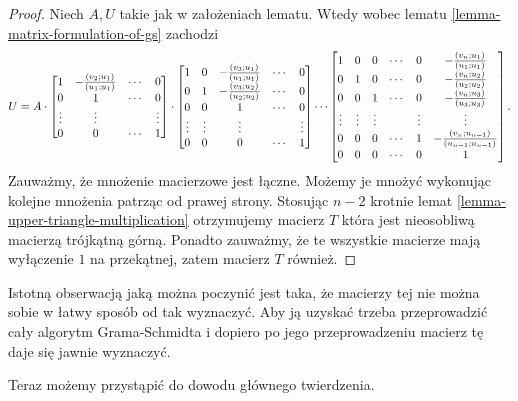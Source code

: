 \documentclass[12pt,a4paper]{report}
\newcommand{\mx}[1]{{#1}}
\newcommand{\proj}[2]{\frac{\scalar{#2}{#1}}{\scalar{#1}{#1}}}
\begin{document}
\begin{proof}
Niech $\mx{A}, \mx{U}$ takie jak w założeniach lematu. Wtedy wobec lematu \ref{lemma-matrix-formulation-of-gs} zachodzi 
$$
U = A \cdot 
\begin{bmatrix}
1 & -\proj{u_1}{v_2} & \cdots & 0 \\
0 & 1 & \cdots & 0 \\
\vdots & \vdots &  & \vdots \\
0 & 0 & \cdots & 1
\end{bmatrix} \cdot
\begin{bmatrix}
1 & 0 & -\proj{u_1}{v_3} &\cdots & 0 \\
0 & 1 & -\proj{u_2}{v_3} &\cdots & 0 \\
0 & 0 & 1 & \cdots & 0 \\
\vdots & \vdots & \vdots &  & \vdots \\
0 & 0 & 0 & \cdots & 1
\end{bmatrix}
 \cdots
\begin{bmatrix}
1 & 0 & 0 & \cdots & 0 & -\proj{u_1}{v_n} \\
0 & 1 & 0 & \cdots & 0 &-\proj{u_2}{v_n} \\
0 & 0 & 1 & \cdots & 0 & -\proj{u_3}{v_n} \\
\vdots & \vdots & \vdots &  & \vdots & \vdots \\
0 & 0 & 0 & \cdots & 1 & -\proj{u_{n-1}}{v_n} \\
0 & 0 & 0 & \cdots & 0 & 1
\end{bmatrix}.
$$ 
Zauważmy, że mnożenie macierzowe jest łączne. Możemy je mnożyć wykonując kolejne mnożenia patrząc od prawej strony. Stosując $n-2$ krotnie lemat \ref{lemma-upper-triangle-multiplication} otrzymujemy macierz $\mx{T}$ która jest nieosobliwą macierzą trójkątną górną. Ponadto zauważmy, że te wszystkie macierze mają wyłączenie $1$ na przekątnej, zatem macierz $\mx{T}$ również. 
\end{proof}

Istotną obserwacją jaką można poczynić jest taka, że macierzy tej nie można sobie w łatwy sposób od tak wyznaczyć. Aby ją uzyskać trzeba przeprowadzić cały algorytm Grama-Schmidta i dopiero po jego przeprowadzeniu macierz tę daje się jawnie wyznaczyć.


Teraz możemy przystąpić do dowodu głównego twierdzenia.
\end{document}

